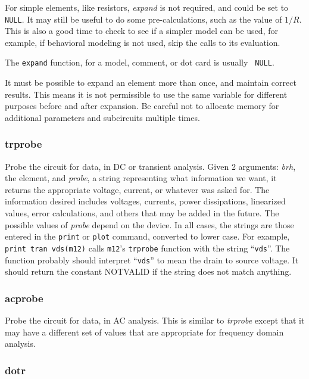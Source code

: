 For simple elements, like resistors, {\em expand} is not required, and could
be set to {\tt NULL}.  It may still be useful to do some pre-calculations,
such as the value of $1/R$.  This is also a good time to check to see if a
simpler model can be used, for example, if behavioral modeling is not used,
skip the calls to its evaluation.

The {\tt expand} function, for a model, comment, or dot card is usually {\tt
NULL}.

It must be possible to expand an element more than once, and maintain
correct results.  This means it is not permissible to use the same variable
for different purposes before and after expansion.  Be careful not to
allocate memory for additional parameters and subcircuits multiple times.
\subsubsection{trprobe}

Probe the circuit for data, in DC or transient analysis.  Given 2
arguments:  {\em brh}, the element, and {\em probe}, a string representing
what information we want, it returns the appropriate voltage, current, or
whatever was asked for.  The information desired includes voltages,
currents, power dissipations, linearized values, error calculations, and
others that may be added in the future.  The possible values of {\em probe}
depend on the device.  In all cases, the strings are those entered in the
{\tt print} or {\tt plot} command, converted to lower case.  For example,
{\tt print tran vds(m12)} calls {\tt m12}'s {\tt trprobe} function with the
string ``{\tt vds}''.  The function probably should interpret ``{\tt vds}''
to mean the drain to source voltage.  It should return the constant NOTVALID
if the string does not match anything.
\subsubsection{acprobe}

Probe the circuit for data, in AC analysis.  This is similar to {\em
trprobe} except that it may have a different set of values that are
appropriate for frequency domain analysis.
\subsubsection{dotr}

